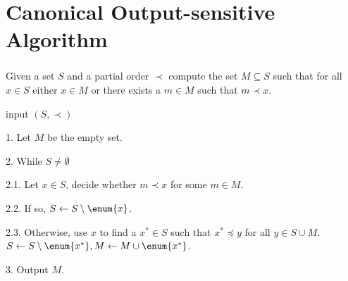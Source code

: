 \section{Canonical Output-sensitive Algorithm}
\begin{frame}\frametitle{\insertsection}\justifying
\begin{probl}
Given a set \(S\) and a partial order \(\prec\) compute the set \(M \subseteq S\)
such that for all \(x \in S\) either \(x \in M\) or there exists a \(m \in M\)
such that \(m \prec x\).
\end{probl}
\pause
\begin{algo}
\item[input] \((S, \prec)\)
\item[1.] Let \(M\) be the empty set.
\item[2.] While \(S \neq \emptyset\)
\item[2.1.] Let \(x \in S\), decide whether \(m \prec x\) for some \(m \in M\).
\item[2.2.] If so, \(S \gets S \setminus \enum{x}\).
\item[2.3.] Otherwise, use \(x\) to find a \(x^* \in S\) such that \(x^*
	\preceq y\) for all \(y \in S \cup M\). \(S \gets S \setminus \enum{x^*}, M
	\gets M \cup \enum{x^*}\).
\item[3.] Output \(M\).
\end{algo}
\end{frame}
